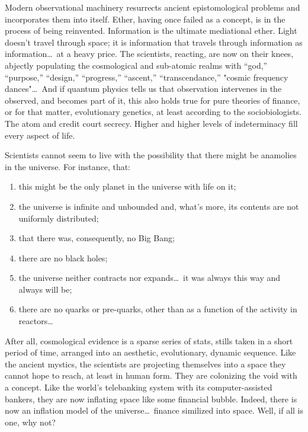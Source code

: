 \documentclass[11pt,twoside,draft]{memoir}
\begin{document}
Modern observational machinery resurrects ancient epistomological problems and incorporates them into itself. Ether, having once failed as a concept, is in the process of being reinvented. Information is the ultimate mediational ether. Light doesn't travel through space; it is information that travels through information as information\ldots\ at a heavy price. The scientists, reacting, are now on their knees, abjectly populating the cosmological and sub-atomic realms with \enquote{god,} \enquote{purpose,} \enquote{design,} \enquote{progress,} \enquote{ascent,} \enquote{transcendance,} "cosmic frequency dances"\ldots\ And if quantum physics tells us that observation intervenes in the observed, and becomes part of it, this also holds true for pure theories of finance, or for that matter, evolutionary genetics, at least according to the sociobiologists. The atom and credit court secrecy. Higher and higher levels of indeterminacy fill every aspect of life.

Scientists cannot seem to live with the possibility that there might be anamolies in the universe. For instance, that: 
\begin{enumerate}
\item this might be the only planet in the universe with life on it; 
\item the universe is infinite and unbounded and, what's more, its contents are not uniformly distributed;
\item that there was, consequently, no Big Bang; 
\item there are no black holes; 
\item the universe neither contracts nor expands\ldots\ it was always this way and always will be; 
\item there are no quarks or pre-quarks, other than as a function of the activity in reactors\ldots
\end{enumerate}
After all, cosmological evidence is a sparse series of stats, stills taken in a short period of time, arranged into an aesthetic, evolutionary, dynamic sequence. Like the ancient mystics, the scientists are projecting themselves into a space they cannot hope to reach, at least in human form. They are colonizing the void with a concept. Like the world's telebanking system with its computer-assisted bankers, they are now inflating space like some financial bubble. Indeed, there is now an inflation model of the universe\ldots\ finance similized into space. Well, if all is one, why not?
\end{document}
